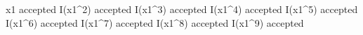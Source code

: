 
 x1 	accepted
 I(x1^2) 	accepted
 I(x1^3) 	accepted
 I(x1^4) 	accepted
 I(x1^5) 	accepted
 I(x1^6) 	accepted
 I(x1^7) 	accepted
 I(x1^8) 	accepted
 I(x1^9) 	accepted
